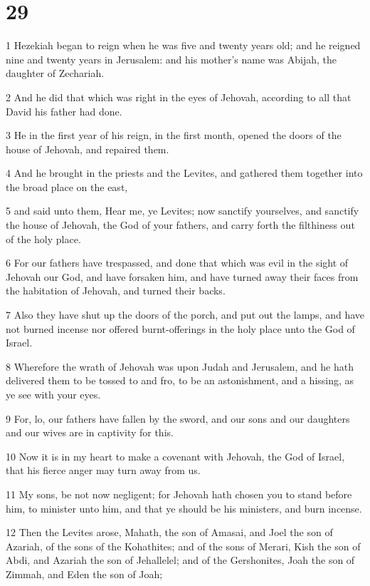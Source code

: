 \chapter{29}

\par 1 Hezekiah began to reign when he was five and twenty years old; and he reigned nine and twenty years in Jerusalem: and his mother's name was Abijah, the daughter of Zechariah.
\par 2 And he did that which was right in the eyes of Jehovah, according to all that David his father had done.
\par 3 He in the first year of his reign, in the first month, opened the doors of the house of Jehovah, and repaired them.
\par 4 And he brought in the priests and the Levites, and gathered them together into the broad place on the east,
\par 5 and said unto them, Hear me, ye Levites; now sanctify yourselves, and sanctify the house of Jehovah, the God of your fathers, and carry forth the filthiness out of the holy place.
\par 6 For our fathers have trespassed, and done that which was evil in the sight of Jehovah our God, and have forsaken him, and have turned away their faces from the habitation of Jehovah, and turned their backs.
\par 7 Also they have shut up the doors of the porch, and put out the lamps, and have not burned incense nor offered burnt-offerings in the holy place unto the God of Israel.
\par 8 Wherefore the wrath of Jehovah was upon Judah and Jerusalem, and he hath delivered them to be tossed to and fro, to be an astonishment, and a hissing, as ye see with your eyes.
\par 9 For, lo, our fathers have fallen by the sword, and our sons and our daughters and our wives are in captivity for this.
\par 10 Now it is in my heart to make a covenant with Jehovah, the God of Israel, that his fierce anger may turn away from us.
\par 11 My sons, be not now negligent; for Jehovah hath chosen you to stand before him, to minister unto him, and that ye should be his ministers, and burn incense.
\par 12 Then the Levites arose, Mahath, the son of Amasai, and Joel the son of Azariah, of the sons of the Kohathites; and of the sons of Merari, Kish the son of Abdi, and Azariah the son of Jehallelel; and of the Gershonites, Joah the son of Zimmah, and Eden the son of Joah;
